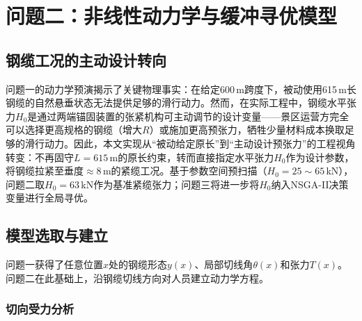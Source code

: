 \documentclass[12pt,a4paper]{ctexart}
\begin{document}
\section{问题二：非线性动力学与缓冲寻优模型}

\subsection{钢缆工况的主动设计转向}

问题一的动力学预演揭示了关键物理事实：在给定600\,m跨度下，被动使用615\,m长钢缆的自然悬垂状态无法提供足够的滑行动力。然而，在实际工程中，钢缆水平张力$H_0$是通过两端锚固装置的张紧机构可主动调节的设计变量——景区运营方完全可以选择更高规格的钢缆（增大$R$）或施加更高预张力，牺牲少量材料成本换取足够的滑行动力。因此，本文实现从``被动给定原长''到``主动设计预张力''的工程视角转变：不再固守$L=615$\,m的原长约束，转而直接指定水平张力$H_0$作为设计参数，将钢缆拉紧至垂度$\approx 8$\,m的紧缆工况。基于参数空间预扫描（$H_0=25\sim65$\,kN），问题二取$H_0=63$\,kN作为基准紧缆张力；问题三将进一步将$H_0$纳入NSGA-II决策变量进行全局寻优。

\subsection{模型选取与建立}

问题一获得了任意位置$x$处的钢缆形态$y(x)$、局部切线角$\theta(x)$和张力$T(x)$。问题二在此基础上，沿钢缆切线方向对人员建立动力学方程。

\subsubsection{切向受力分析}
\end{document}

